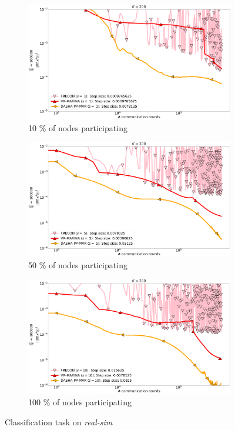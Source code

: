 \documentclass[10pt]{article}
\begin{document}
\begin{figure}[H]
    \begin{subfigure}{.33\textwidth}
        \includegraphics[width=\textwidth]{neurips_2022_stochastic_real-sim_nof_200_numnodes_10_probs_mega_batch_100000_fix_nm_bug_number_of_workers_1.pdf}
        \caption{10 \% of nodes participating}
    \end{subfigure}
    \begin{subfigure}{.33\textwidth}
        \includegraphics[width=\textwidth]{neurips_2022_stochastic_real-sim_nof_200_numnodes_10_probs_mega_batch_100000_fix_nm_bug_number_of_workers_5.pdf}
        \caption{50 \% of nodes participating}
    \end{subfigure}
    \begin{subfigure}{.33\textwidth}
        \includegraphics[width=\textwidth]{neurips_2022_stochastic_real-sim_nof_200_numnodes_10_probs_mega_batch_100000_fix_nm_bug_number_of_workers_10.pdf}
        \caption{100 \% of nodes participating}
    \end{subfigure}
\caption{Classification task on \textit{real-sim}}
\label{fig:stoch-real-sim}
\end{figure}
\end{document}
